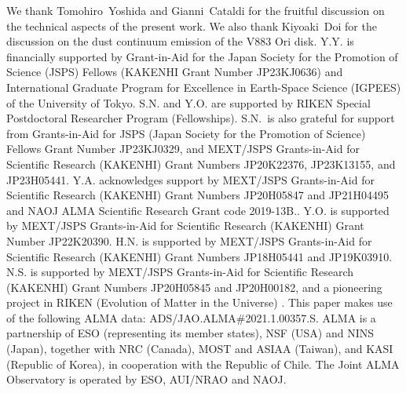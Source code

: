 \documentclass[linenumbers, twocolumn, twocolappendix, astrosymb, times]{aastex631}
\begin{document}
\begin{acknowledgments}
We thank Tomohiro~Yoshida and Gianni~Cataldi for the fruitful discussion on the technical aspects of the present work. We also thank Kiyoaki~Doi for the discussion on the dust continuum emission of the V883 Ori disk. 
Y.Y. is financially supported by Grant-in-Aid for the Japan
Society for the Promotion of Science (JSPS) Fellows (KAKENHI Grant Number JP23KJ0636) and International Graduate Program for Excellence in Earth-Space Science (IGPEES) of the University of Tokyo.
S.N. and Y.O. are supported by RIKEN Special Postdoctoral Researcher Program (Fellowships).
S.N.~is also grateful for support from Grants-in-Aid for JSPS (Japan Society for the Promotion of Science) Fellows Grant Number JP23KJ0329, and MEXT/JSPS Grants-in-Aid for Scientific Research (KAKENHI) Grant Numbers JP20K22376, JP23K13155, and JP23H05441.
Y.A. acknowledges support by MEXT/JSPS Grants-in-Aid for Scientific Research (KAKENHI) Grant Numbers JP20H05847 and JP21H04495 and NAOJ ALMA Scientific Research Grant code 2019-13B..
Y.O. is supported by MEXT/JSPS Grants-in-Aid for Scientific Research (KAKENHI) Grant Number JP22K20390.
H.N. is supported by MEXT/JSPS Grants-in-Aid for Scientific Research (KAKENHI) Grant Numbers JP18H05441 and JP19K03910.
N.S. is supported by MEXT/JSPS Grants-in-Aid for Scientific Research (KAKENHI) Grant Numbers JP20H05845 and JP20H00182, and a pioneering project in RIKEN (Evolution of Matter in the Universe) .
This paper makes use of the following ALMA data: ADS/JAO.ALMA\#2021.1.00357.S. 
ALMA is a partnership of ESO (representing its member states), NSF (USA) and NINS (Japan), together with NRC (Canada), MOST and ASIAA (Taiwan), and KASI (Republic of Korea), in cooperation with the Republic of Chile. The Joint ALMA Observatory is operated by ESO, AUI/NRAO and NAOJ. 

\end{acknowledgments}

%
\end{document}

